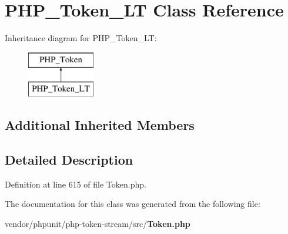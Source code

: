 \section{P\+H\+P\+\_\+\+Token\+\_\+\+L\+T Class Reference}
\label{class_p_h_p___token___l_t}
Inheritance diagram for P\+H\+P\+\_\+\+Token\+\_\+\+L\+T\+:\begin{figure}[H]
\begin{center}
\leavevmode
\includegraphics[height=2.000000cm]{class_p_h_p___token___l_t}
\end{center}
\end{figure}
\subsection*{Additional Inherited Members}


\subsection{Detailed Description}


Definition at line 615 of file Token.\+php.



The documentation for this class was generated from the following file\+:\begin{DoxyCompactItemize}
\item 
vendor/phpunit/php-\/token-\/stream/src/{\bf Token.\+php}\end{DoxyCompactItemize}
